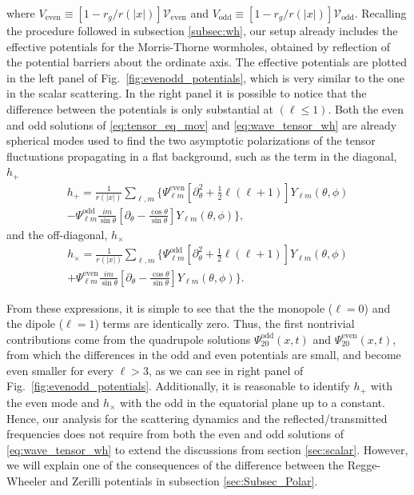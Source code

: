\documentclass[article,aps,nofootinbib,twocolumn,superscriptaddress]{revtex4-1}
\begin{document}
where $V_{\mathrm{even}}\equiv[1-r_g/r(|x|)]\mathcal{V}_{\mathrm{even}}$ and $V_{\mathrm{odd}}\equiv[1-r_g/r(|x|)]\mathcal{V}_{\mathrm{odd}}$. Recalling the procedure followed in subsection \ref{subsec:wh}, our setup already includes the effective potentials for the Morris-Thorne wormholes, obtained by reflection of the potential barriers about the ordinate axis. The effective potentials are plotted in the left panel of Fig.~\ref{fig:evenodd_potentials}, which is very similar to the one in the scalar scattering. In the right panel it is possible to notice that the difference between the potentials is only substantial at $(\ell\leq1)$. Both the even and odd solutions of \eqref{eq:tensor_eq_mov} and \eqref{eq:wave_tensor_wh} are already spherical modes used to find the two asymptotic polarizations of the tensor fluctuations propagating in a flat background, such as the term in the diagonal, $h_+$ 
\begin{align}
\displaystyle{h_+=\frac{1}{r(|x|)}\sum_{\ell,m}\bigg\{\Psi_{\ell m}^{\mathrm{even}}\left[\partial^2_{\theta}+\frac{1}{2}\ell(\ell+1)\right]Y_{\ell m}(\theta,\phi)}\nonumber\\
\displaystyle{-\Psi_{\ell m}^{\mathrm{odd}}\frac{i m}{\sin\theta}\left[\partial_{\theta}-\frac{\cos\theta}{\sin\theta}\right]Y_{\ell m}(\theta,\phi)\bigg\}},
\label{eq:hplus}
\end{align} 
and the off-diagonal, $h_{\times}$ 
\begin{align}
\displaystyle{h_{\times}=\frac{1}{r(|x|)}\sum_{\ell,m}\bigg\{\Psi_{\ell m}^{\mathrm{odd}}\left[\partial^2_{\theta}+\frac{1}{2}\ell(\ell+1)\right]Y_{\ell m}(\theta,\phi)}\nonumber\\
\displaystyle{+\Psi_{\ell m}^{\mathrm{even}}\frac{i m}{\sin\theta}\left[\partial_{\theta}-\frac{\cos\theta}{\sin\theta}\right]Y_{\ell m}(\theta,\phi)\bigg\}}.
\label{eq:hx}
\end{align}


From these expressions, it is simple to see that the the monopole ($\ell=0$) and the dipole ($\ell=1$) terms are identically zero. Thus, the first nontrivial contributions come from the quadrupole solutions $\Psi_{20}^{\mathrm{odd}}(x,t)$ and $\Psi_{20}^{\mathrm{even}}(x,t)$, from which the differences in the odd and even potentials are small, and become even smaller for every $\ell>3$, as we can see in right panel of Fig.~\ref{fig:evenodd_potentials}. Additionally, it is reasonable to identify $h_+$ with the even mode and  $h_{\times}$ with the odd in the equatorial plane up to a constant. Hence, our analysis for the scattering dynamics and the reflected/transmitted frequencies does not require from both the even and odd solutions of \eqref{eq:wave_tensor_wh} to extend the discussions from section \ref{sec:scalar}. However, we will explain one of the consequences of the difference between the Regge-Wheeler and Zerilli potentials in subsection \ref{sec:Subsec_Polar}.
\end{document}
